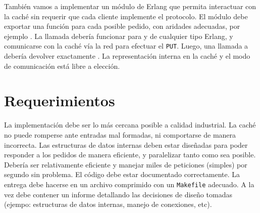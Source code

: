 \documentclass[tp]{lcc}
\begin{document}
También vamos a implementar un módulo de Erlang que permita
interactuar con la caché sin requerir que cada cliente implemente el
protocolo. El módulo debe exportar una función para cada
posible pedido, con aridades adecuadas, por ejemplo .
%
La llamada  debería funcionar para  y 
de cualquier tipo Erlang, y comunicarse con la caché vía la red para
efectuar el \texttt{PUT}.
%
Luego, una llamada a  debería devolver exactamente .
%
La representación interna en la caché y el modo de comunicación está
libre a elección.

\section{Requerimientos}

La implementación debe ser lo más cercana posible a calidad
industrial. 
%
La caché no puede romperse ante entradas mal formadas, ni comportarse
de manera incorrecta.
%
Las estructuras de datos internas deben estar diseñadas para poder
responder a los pedidos de manera eficiente, y paralelizar tanto como
sea posible.
%
Debería ser relativamente eficiente y manejar miles de peticiones
(simples) por segundo sin problema.
%
El código debe estar documentado correctamente. 
%
La entrega debe hacerse en un archivo comprimido con un \texttt{Makefile}
adecuado. A la vez debe contener un informe detallando las decisiones de diseño tomadas (ejempo: estructuras de datos internas, manejo de conexiones, etc).

\printbibliography
\end{document}
